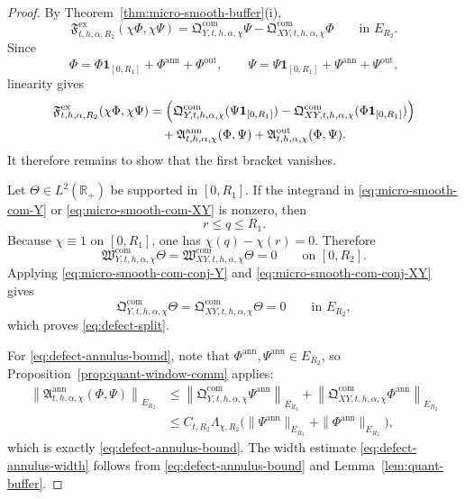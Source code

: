\documentclass[11pt,a4paper]{amsart}
\theoremstyle{plain}
\theoremstyle{definition}
\theoremstyle{remark}
\newcommand{\R}{\mathbb{R}}
\newcommand{\one}{\mathbf 1}
\begin{document}
\begin{proof}
By Theorem~\ref{thm:micro-smooth-buffer}(i),
\[
\mathfrak F_{t,h,\alpha,R_2}^{\mathrm{ex}}(\chi\Phi,\chi\Psi)
=
\mathfrak Q_{Y,t,h,\alpha,\chi}^{\mathrm{com}}\Psi
-
\mathfrak Q_{XY,t,h,\alpha,\chi}^{\mathrm{com}}\Phi
\qquad\text{in }E_{R_2}.
\]
Since
\[
\Phi=\Phi\one_{[0,R_1]}+\Phi^{\mathrm{ann}}+\Phi^{\mathrm{out}},
\qquad
\Psi=\Psi\one_{[0,R_1]}+\Psi^{\mathrm{ann}}+\Psi^{\mathrm{out}},
\]
linearity gives
\begin{align*}
\mathfrak F_{t,h,\alpha,R_2}^{\mathrm{ex}}(\chi\Phi,\chi\Psi)
&=
\Bigl(
\mathfrak Q_{Y,t,h,\alpha,\chi}^{\mathrm{com}}(\Psi\one_{[0,R_1]})
-
\mathfrak Q_{XY,t,h,\alpha,\chi}^{\mathrm{com}}(\Phi\one_{[0,R_1]})
\Bigr)\\
&\quad+
\mathfrak A_{t,h,\alpha,\chi}^{\mathrm{ann}}(\Phi,\Psi)
+
\mathfrak A_{t,h,\alpha,\chi}^{\mathrm{out}}(\Phi,\Psi).
\end{align*}
It therefore remains to show that the first bracket vanishes.

Let \(\Theta\in L^2(\R_+)\) be supported in \([0,R_1]\). If the integrand in
\eqref{eq:micro-smooth-com-Y} or \eqref{eq:micro-smooth-com-XY} is nonzero, then
\[
r\le q\le R_1.
\]
Because \(\chi\equiv1\) on \([0,R_1]\), one has \(\chi(q)-\chi(r)=0\). Therefore
\[
\mathfrak W_{Y,t,h,\alpha,\chi}^{\mathrm{com}}\Theta
=
\mathfrak W_{XY,t,h,\alpha,\chi}^{\mathrm{com}}\Theta
=
0
\qquad\text{on }[0,R_2].
\]
Applying \eqref{eq:micro-smooth-com-conj-Y} and \eqref{eq:micro-smooth-com-conj-XY} gives
\[
\mathfrak Q_{Y,t,h,\alpha,\chi}^{\mathrm{com}}\Theta
=
\mathfrak Q_{XY,t,h,\alpha,\chi}^{\mathrm{com}}\Theta
=
0
\qquad\text{in }E_{R_2},
\]
which proves \eqref{eq:defect-split}.

For \eqref{eq:defect-annulus-bound}, note that
\(\Phi^{\mathrm{ann}},\Psi^{\mathrm{ann}}\in E_{R_2}\), so Proposition~\ref{prop:quant-window-comm}
applies:
\begin{align*}
\left\|
\mathfrak A_{t,h,\alpha,\chi}^{\mathrm{ann}}(\Phi,\Psi)
\right\|_{E_{R_2}}
&\le
\left\|
\mathfrak Q_{Y,t,h,\alpha,\chi}^{\mathrm{com}}\Psi^{\mathrm{ann}}
\right\|_{E_{R_2}}
+
\left\|
\mathfrak Q_{XY,t,h,\alpha,\chi}^{\mathrm{com}}\Phi^{\mathrm{ann}}
\right\|_{E_{R_2}}\\
&\le
C_{t,R_2}\Lambda_{\chi,R_2}
\bigl(
\|\Psi^{\mathrm{ann}}\|_{E_{R_2}}
+
\|\Phi^{\mathrm{ann}}\|_{E_{R_2}}
\bigr),
\end{align*}
which is exactly \eqref{eq:defect-annulus-bound}. The width estimate
\eqref{eq:defect-annulus-width} follows from \eqref{eq:defect-annulus-bound} and
Lemma~\ref{lem:quant-buffer}.
\end{proof}
\end{document}
